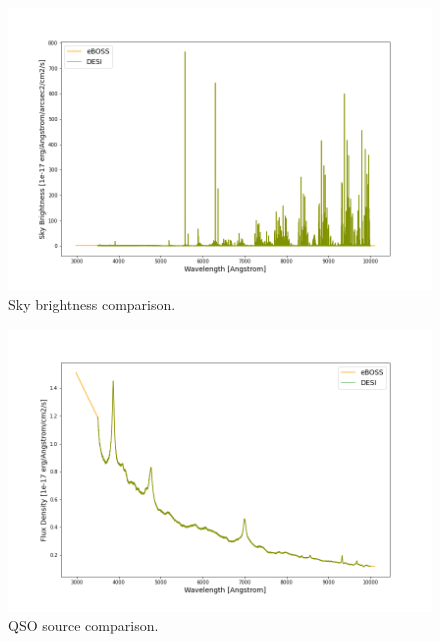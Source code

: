 
\begin{figure}[h]
\centering
\includegraphics[width=12cm]{images/specsim/sky_brightness.png}
\caption{Sky brightness comparison.}
\label{fig:sky_brightness}
\end{figure}


\begin{figure}[h]
\centering
\includegraphics[width=12cm]{images/specsim/source.png}
\caption{QSO source comparison.}
\label{fig:qso_source}
\end{figure}


